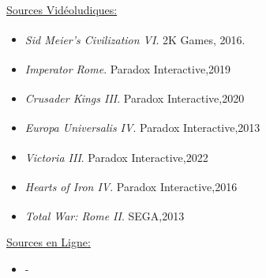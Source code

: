 \documentclass{article}
\def\reg{\small{\textsuperscript{\textregistered}}}
\begin{document}
        \underline{Sources Vidéoludiques:}
            \begin{itemize}
                \item \textit{Sid Meier's Civilization VI\reg}. 2K Games\reg, 2016. \large
                \item \textit{Imperator Rome\reg}. Paradox Interactive\reg,2019\large
                \item \textit{Crusader Kings III\reg}. Paradox Interactive\reg,2020\large
                \item \textit{Europa Universalis IV\reg}. Paradox Interactive\reg,2013\large
                \item \textit{Victoria III\reg}. Paradox Interactive\reg,2022\large
                \item \textit{Hearts of Iron IV\reg}. Paradox Interactive\reg,2016\large
                \item \textit{Total War: Rome II\reg}. SEGA\reg,2013\large
            \end{itemize}
            
        \underline{Sources en Ligne:}
            \begin{itemize}
                \item -
            \end{itemize}
            
\end{document}
